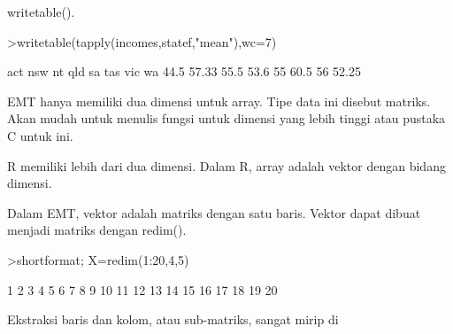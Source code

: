 \documentclass[a4paper,10pt]{article}
\begin{document}
\begin{eulernotebook}
\begin{eulercomment}
\begin{eulercomment}
\begin{eulercomment}
\begin{eulercomment}
\begin{eulercomment}
\begin{eulercomment}
\begin{eulercomment}
\begin{eulercomment}
\begin{eulercomment}
\begin{eulercomment}
\begin{eulercomment}
\begin{eulercomment}
\begin{eulercomment}
\begin{eulercomment}
\begin{eulercomment}
\begin{eulercomment}
\begin{eulercomment}
\begin{eulercomment}
\begin{eulercomment}
\begin{eulercomment}
\begin{eulercomment}
\begin{eulercomment}
\begin{eulercomment}
\begin{eulercomment}
\begin{eulercomment}
\begin{eulercomment}
\begin{eulercomment}
\begin{eulercomment}
\begin{eulercomment}
\begin{eulercomment}
\begin{eulercomment}
\begin{eulercomment}
\begin{eulercomment}
\begin{eulercomment}
\begin{eulercomment}
\begin{eulercomment}
\begin{eulercomment}
\begin{eulercomment}
\begin{eulercomment}
\begin{eulercomment}
\begin{eulercomment}
\begin{eulercomment}
\begin{eulercomment}
\begin{eulercomment}
\begin{eulercomment}
\begin{eulercomment}
\begin{eulercomment}
\begin{eulercomment}
\begin{eulercomment}
\begin{eulercomment}
\begin{eulercomment}
\begin{eulercomment}
\begin{eulercomment}
\begin{eulercomment}
\begin{eulercomment}
\begin{eulercomment}
\begin{eulercomment}
\begin{eulercomment}
\begin{eulercomment}
\begin{eulercomment}
\begin{eulercomment}
\begin{eulercomment}
\begin{eulercomment}
\begin{eulercomment}
\begin{eulercomment}
\begin{eulercomment}
\begin{eulercomment}
\begin{eulercomment}
\begin{eulercomment}
writetable().
\end{eulercomment}
\begin{eulerprompt}
>writetable(tapply(incomes,statef,"mean"),wc=7)
\end{eulerprompt}
\begin{euleroutput}
      act    nsw     nt    qld     sa    tas    vic     wa
     44.5  57.33   55.5   53.6     55   60.5     56  52.25
\end{euleroutput}
\begin{eulercomment}
EMT hanya memiliki dua dimensi untuk array. Tipe data ini disebut
matriks. Akan mudah untuk menulis fungsi untuk dimensi yang lebih
tinggi atau pustaka C untuk ini.

R memiliki lebih dari dua dimensi. Dalam R, array adalah vektor dengan
bidang dimensi.

Dalam EMT, vektor adalah matriks dengan satu baris. Vektor dapat
dibuat menjadi matriks dengan redim().
\end{eulercomment}
\begin{eulerprompt}
>shortformat; X=redim(1:20,4,5)
\end{eulerprompt}
\begin{euleroutput}
          1         2         3         4         5 
          6         7         8         9        10 
         11        12        13        14        15 
         16        17        18        19        20 
\end{euleroutput}
\begin{eulercomment}
Ekstraksi baris dan kolom, atau sub-matriks, sangat mirip di 
\end{eulercomment}
\end{eulercomment}
\end{eulercomment}
\end{eulercomment}
\end{eulercomment}
\end{eulercomment}
\end{eulercomment}
\end{eulercomment}
\end{eulercomment}
\end{eulercomment}
\end{eulercomment}
\end{eulercomment}
\end{eulercomment}
\end{eulercomment}
\end{eulercomment}
\end{eulercomment}
\end{eulercomment}
\end{eulercomment}
\end{eulercomment}
\end{eulercomment}
\end{eulercomment}
\end{eulercomment}
\end{eulercomment}
\end{eulercomment}
\end{eulercomment}
\end{eulercomment}
\end{eulercomment}
\end{eulercomment}
\end{eulercomment}
\end{eulercomment}
\end{eulercomment}
\end{eulercomment}
\end{eulercomment}
\end{eulercomment}
\end{eulercomment}
\end{eulercomment}
\end{eulercomment}
\end{eulercomment}
\end{eulercomment}
\end{eulercomment}
\end{eulercomment}
\end{eulercomment}
\end{eulercomment}
\end{eulercomment}
\end{eulercomment}
\end{eulercomment}
\end{eulercomment}
\end{eulercomment}
\end{eulercomment}
\end{eulercomment}
\end{eulercomment}
\end{eulercomment}
\end{eulercomment}
\end{eulercomment}
\end{eulercomment}
\end{eulercomment}
\end{eulercomment}
\end{eulercomment}
\end{eulercomment}
\end{eulercomment}
\end{eulercomment}
\end{eulercomment}
\end{eulercomment}
\end{eulercomment}
\end{eulercomment}
\end{eulercomment}
\end{eulercomment}
\end{eulercomment}
\end{eulercomment}
\end{eulernotebook}
\end{document}
